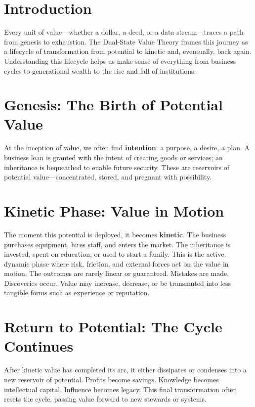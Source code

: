 \documentclass[11pt,oneside]{book}
\begin{document}
\section{Introduction}

Every unit of value—whether a dollar, a deed, or a data stream—traces a path from genesis to exhaustion. The Dual-State Value Theory frames this journey as a lifecycle of transformation from potential to kinetic and, eventually, back again. Understanding this lifecycle helps us make sense of everything from business cycles to generational wealth to the rise and fall of institutions.

\section{Genesis: The Birth of Potential Value}

At the inception of value, we often find \textbf{intention}: a purpose, a desire, a plan. A business loan is granted with the intent of creating goods or services; an inheritance is bequeathed to enable future security. These are reservoirs of potential value—concentrated, stored, and pregnant with possibility.

\section{Kinetic Phase: Value in Motion}

The moment this potential is deployed, it becomes \textbf{kinetic}. The business purchases equipment, hires staff, and enters the market. The inheritance is invested, spent on education, or used to start a family. This is the active, dynamic phase where risk, friction, and external forces act on the value in motion. The outcomes are rarely linear or guaranteed. Mistakes are made. Discoveries occur. Value may increase, decrease, or be transmuted into less tangible forms such as experience or reputation.

\section{Return to Potential: The Cycle Continues}

After kinetic value has completed its arc, it either dissipates or condenses into a new reservoir of potential. Profits become savings. Knowledge becomes intellectual capital. Influence becomes legacy. This final transformation often resets the cycle, passing value forward to new stewards or systems.
\end{document}
